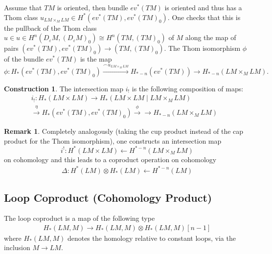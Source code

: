 \documentclass{scrartcl}
\theoremstyle{plain}
\theoremstyle{definition}
\newtheorem{remark}[theorem]{Remark}
\newtheorem{construction}[theorem]{Construction}
\renewcommand{\epsilon}{\varepsilon}
\newcommand{\capp}{\mathbin{\frown}}
\newcommand{\iso}{\cong}
\newcommand{\from}{\leftarrow}
\let\xto\xrightarrow
\begin{document}

Assume that $TM$ is oriented, then bundle $ev^*(TM)$ is oriented and thus has a Thom class $u_{LM\times_M LM}\in H^*(ev^*(TM), ev^*(TM)_0)$. One checks that this is the pullback of the Thom class $u\in u\in H^n(D_\epsilon M, (D_\epsilon M)_0) \iso H^n(TM, (TM)_0)$ of $M$ along the map of pairs $(ev^*(TM), ev^*(TM)_0) \to (TM, (TM)_0)$. The Thom isomorphism $\phi$ of the bundle $ev^*(TM)$ is the map $$\phi\colon H_*(ev^*(TM), ev^*(TM)_0) \xto{\capp u_{LM\times_M LM}} H_{*-n}(ev^*(TM)) \to H_{*-n}(LM\times_M LM).$$

\begin{construction}\label{constr:loop-intersection-classical}
The intersection map $i_!$ is the following composition of maps: 
\begin{align*}
    i_!\colon H_*(LM\times LM) \to H_*(LM\times LM \mid LM\times_M LM) &\\ \xto{\eta} H_*(ev^*(TM), ev^*(TM)_0) \xto{\phi} \to H_{*-n}(LM\times_M LM) &
\end{align*}
\end{construction}

\begin{remark}
    Completely analogously (taking the cup product instead of the cap product for the Thom isomorphism), one constructs an intersection map $$i^!\colon H^*(LM\times LM)\from H^{*-n}(LM\times_M LM)$$
    on cohomology and this leads to a coproduct operation on cohomology
    \begin{align*}
        \Delta\colon H^*(LM)\otimes H_*(LM)\from H^{*-n}(LM)
    \end{align*}
\end{remark}

\subsection{Loop Coproduct (Cohomology Product)}\label{subsec:loop-coproduct-classical}

The loop coproduct is a map of the following type
\begin{align*}
    H_*(LM, M) \to H_*(LM, M)\otimes H_{*}(LM, M)[n-1]
\end{align*}
where $H_*(LM, M)$ denotes the homology relative to constant loops, via the inclusion $M\to LM$.
\end{document}
